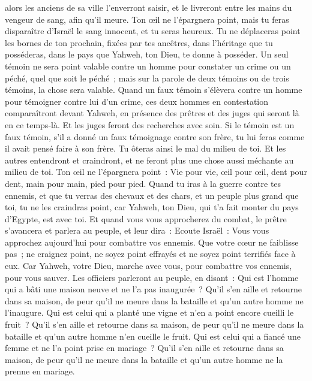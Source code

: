 \begin{multicols}{2}
alors les anciens de sa ville l'enverront saisir, et le livreront entre les mains du vengeur de sang, afin qu'il meure.
Ton œil ne l'épargnera point, mais tu feras disparaître d'Israël le sang innocent, et tu seras heureux.
Tu ne déplaceras point les bornes de ton prochain, fixées par tes ancêtres, dans l'héritage que tu posséderas, dans le pays que Yahweh, ton Dieu, te donne à posséder.
Un seul témoin ne sera point valable contre un homme pour constater un crime ou un péché, quel que soit le péché~; mais sur la parole de deux témoins ou de trois témoins, la chose sera valable.
Quand un faux témoin s'élèvera contre un homme pour témoigner contre lui d'un crime,
ces deux hommes en contestation comparaîtront devant Yahweh, en présence des prêtres et des juges qui seront là en ce temps-là.
Et les juges feront des recherches avec soin. Si le témoin est un faux témoin, s'il a donné un faux témoignage contre son frère,
tu lui feras comme il avait pensé faire à son frère. Tu ôteras ainsi le mal du milieu de toi.
Et les autres entendront et craindront, et ne feront plus une chose aussi méchante au milieu de toi.
Ton œil ne l'épargnera point~: Vie pour vie, œil pour œil, dent pour dent, main pour main, pied pour pied.
\VerseOne{}Quand tu iras à la guerre contre tes ennemis, et que tu verras des chevaux et des chars, et un peuple plus grand que toi, tu ne les craindras point, car Yahweh, ton Dieu, qui t'a fait monter du pays d'Egypte, est avec toi.
Et quand vous vous approcherez du combat, le prêtre s'avancera et parlera au peuple,
et leur dira~: Ecoute Israël~: Vous vous approchez aujourd'hui pour combattre vos ennemis. Que votre cœur ne faiblisse pas~; ne craignez point, ne soyez point effrayés et ne soyez point terrifiés face à eux.
Car Yahweh, votre Dieu, marche avec vous, pour combattre vos ennemis, pour vous sauver.
Les officiers parleront au peuple, en disant~: Qui est l'homme qui a bâti une maison neuve et ne l'a pas inaugurée~? Qu'il s'en aille et retourne dans sa maison, de peur qu'il ne meure dans la bataille et qu'un autre homme ne l'inaugure.
Qui est celui qui a planté une vigne et n'en a point encore cueilli le fruit~? Qu'il s'en aille et retourne dans sa maison, de peur qu'il ne meure dans la bataille et qu'un autre homme n'en cueille le fruit.
Qui est celui qui a fiancé une femme et ne l'a point prise en mariage~? Qu'il s'en aille et retourne dans sa maison, de peur qu'il ne meure dans la bataille et qu'un autre homme ne la prenne en mariage.

\end{multicols}
